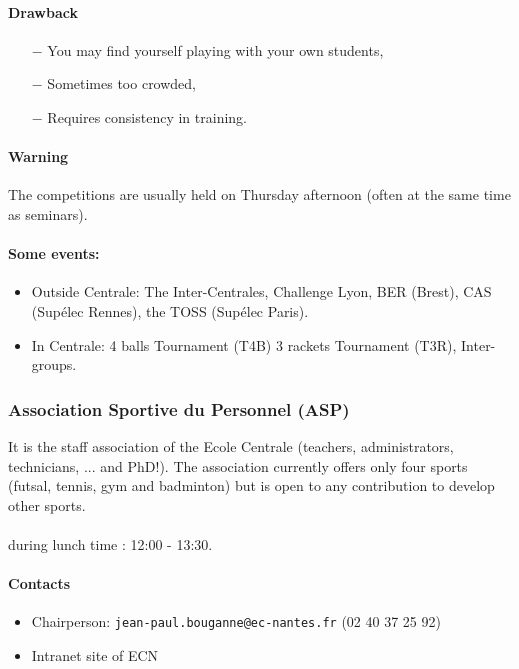 \paragraph{Drawback}
\begin{itemize}
  \item [$-$] You may find yourself playing with your own students,
  \item [$-$] Sometimes too crowded,
  \item [$-$] Requires consistency in training.
\end{itemize}

\paragraph{Warning} The competitions are usually held on Thursday afternoon (often at the same time as seminars).


\paragraph{Some events:}
\begin{itemize}
  \item Outside Centrale: The Inter-Centrales, Challenge Lyon, BER (Brest), CAS (Supélec Rennes), the TOSS (Supélec Paris).
  \item In Centrale:  4 balls Tournament (T4B) 3 rackets Tournament (T3R), Inter-groups.
\end{itemize}

\subsubsection {Association Sportive du Personnel (ASP)}
It is the staff association of the Ecole Centrale (teachers, administrators, technicians, ... and PhD!). The association currently offers only four sports (futsal, tennis, gym and badminton) but is open to any contribution to develop other sports.

\paragraph{} during lunch time : 12:00 - 13:30.
\paragraph{Contacts}
\begin {itemize}
  \item Chairperson: \texttt{jean-paul.bouganne@ec-nantes.fr} (02 40 37 25 92)
  \item Intranet site of ECN
\end {itemize}
